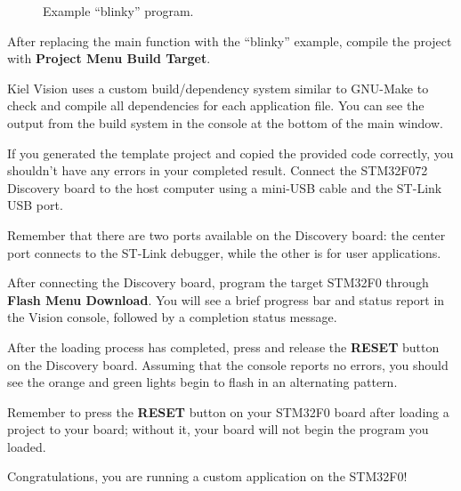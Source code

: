 \documentclass[11pt,fleqn]{book} %
\newcommand{\code}[3]{
    \begin{figure}[]
        \begin{center}
            \hspace*{-3.4cm}
            \colorbox{gray!20!white}{
                \parbox{0.8\paperwidth} {
                    
                }
            }
            \caption{#2}
            \label{#3}
        \end{center}
    \end{figure}
}
\begin{document}
%		

\code{./Files/blinky.c}{Example ``blinky'' program.}{blinky1}

After replacing the main function with the ``blinky'' example, compile the project with \textbf{Project Menu \textrightarrow Build Target}. 

Kiel {\textmu}Vision uses a custom build/dependency system similar to GNU-Make to check and compile all dependencies for each application file. You can see the output from the build system in the console at the bottom of the main window.

If you generated the template project and copied the provided code correctly, you shouldn't have any errors in your completed result. Connect the STM32F072 Discovery board to the host computer using a mini-USB cable and the ST-Link USB port. 

\begin{warning}
	Remember that there are two ports available on the Discovery board: the center port connects to the ST-Link debugger, while the other is for user applications.
\end{warning}

After connecting the Discovery board, program the target STM32F0 through \textbf{Flash Menu \textrightarrow Download}. You will see a brief progress bar and status report in the {\textmu}Vision console, followed by a completion status message. 

After the loading process has completed, press and release the \textbf{RESET} button on the Discovery board. Assuming that the console reports no errors, you should see the orange and green lights begin to flash in an alternating pattern. \\

\begin{warning}
	Remember to press the \textbf{RESET} button on your STM32F0 board after loading a project to your board; without it, your board will not begin the program you loaded.
\end{warning}

Congratulations, you are running a custom application on the STM32F0! 




\end{document}
